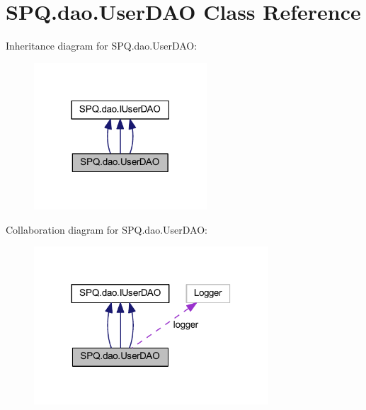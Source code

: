 \hypertarget{class_s_p_q_1_1dao_1_1_user_d_a_o}{}\section{S\+P\+Q.\+dao.\+User\+D\+AO Class Reference}
\label{class_s_p_q_1_1dao_1_1_user_d_a_o}


Inheritance diagram for S\+P\+Q.\+dao.\+User\+D\+AO\+:
\nopagebreak
\begin{figure}[H]
\begin{center}
\leavevmode
\includegraphics[width=183pt]{class_s_p_q_1_1dao_1_1_user_d_a_o__inherit__graph}
\end{center}
\end{figure}


Collaboration diagram for S\+P\+Q.\+dao.\+User\+D\+AO\+:
\nopagebreak
\begin{figure}[H]
\begin{center}
\leavevmode
\includegraphics[width=248pt]{class_s_p_q_1_1dao_1_1_user_d_a_o__coll__graph}
\end{center}
\end{figure}
